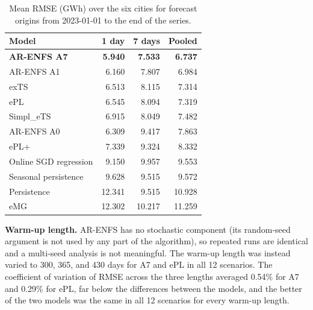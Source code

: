 \documentclass[preprint,12pt]{elsarticle}
\begin{document}
\begin{table}[!t]
\caption{Mean RMSE (GWh) over the six cities for forecast origins from 2023-01-01 to the end of the series.}
\label{tab:holdout_global}
\centering
\small
\begin{tabular}{lrrr}
\toprule
\textbf{Model} & \textbf{1 day} & \textbf{7 days} & \textbf{Pooled} \\
\midrule
\textbf{AR-ENFS A7} & \textbf{5.940} & \textbf{7.533} & \textbf{6.737} \\
AR-ENFS A1 & 6.160 & 7.807 & 6.984 \\
exTS & 6.513 & 8.115 & 7.314 \\
ePL & 6.545 & 8.094 & 7.319 \\
Simpl\_eTS & 6.915 & 8.049 & 7.482 \\
AR-ENFS A0 & 6.309 & 9.417 & 7.863 \\
ePL+ & 7.339 & 9.324 & 8.332 \\
Online SGD regression & 9.150 & 9.957 & 9.553 \\
Seasonal persistence & 9.628 & 9.515 & 9.572 \\
Persistence & 12.341 & 9.515 & 10.928 \\
eMG & 12.302 & 10.217 & 11.259 \\
\bottomrule
\end{tabular}
\end{table}

\textbf{Warm-up length.} AR-ENFS has no stochastic component (its random-seed argument is not used by any part of the algorithm), so repeated runs are identical and a multi-seed analysis is not meaningful. The warm-up length was instead varied to 300, 365, and 430 days for A7 and ePL in all 12 scenarios. The coefficient of variation of RMSE across the three lengths averaged 0.54\% for A7 and 0.29\% for ePL, far below the differences between the models, and the better of the two models was the same in all 12 scenarios for every warm-up length.
\end{document}

